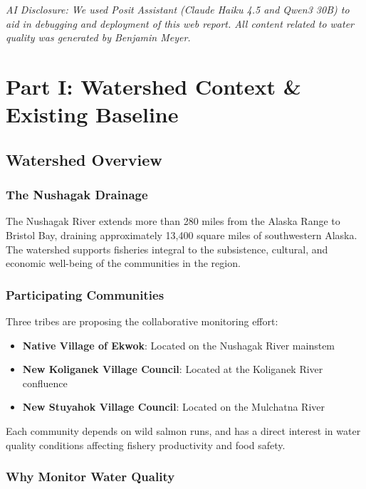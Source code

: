 \documentclass[
  letterpaper,
]{scrbook}
\providecommand{\tightlist}{%
  \setlength{\itemsep}{0pt}\setlength{\parskip}{0pt}}\usepackage{longtable,booktabs,array}
\begin{document}
\emph{AI Disclosure: We used Posit Assistant (Claude Haiku 4.5 and Qwen3
30B) to aid in debugging and deployment of this web report. All content
related to water quality was generated by Benjamin Meyer.}

\part{Part I: Watershed Context \& Existing Baseline}

\chapter{Watershed Overview}\label{watershed-overview}

\section{The Nushagak Drainage}\label{the-nushagak-drainage}

The Nushagak River extends more than 280 miles from the Alaska Range to
Bristol Bay, draining approximately 13,400 square miles of southwestern
Alaska. The watershed supports fisheries integral to the subsistence,
cultural, and economic well-being of the communities in the region.

\section{Participating Communities}\label{participating-communities}

Three tribes are proposing the collaborative monitoring effort:

\begin{itemize}
\tightlist
\item
  \textbf{Native Village of Ekwok}: Located on the Nushagak River
  mainstem
\item
  \textbf{New Koliganek Village Council}: Located at the Koliganek River
  confluence
\item
  \textbf{New Stuyahok Village Council}: Located on the Mulchatna River
\end{itemize}

Each community depends on wild salmon runs, and has a direct interest in
water quality conditions affecting fishery productivity and food safety.

\section{Why Monitor Water Quality}\label{why-monitor-water-quality}
\end{document}
